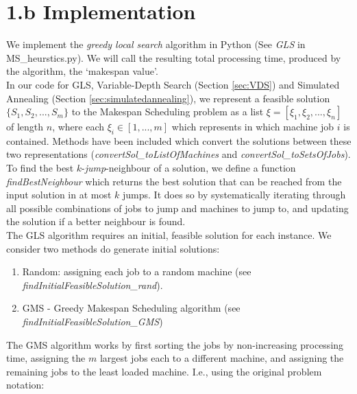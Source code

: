 \documentclass[12pt,a4paper,reqno]{article}
\begin{document}
\section*{1.b Implementation} \label{sec:implementation}
We implement the \textit{greedy local search} algorithm in Python (See \emph{GLS} in MS\_heurstics.py). We will call the resulting total processing time, produced by the algorithm, the `makespan value'. \\

In our code for GLS, Variable-Depth Search (Section \ref{sec:VDS}) and Simulated Annealing (Section \ref{sec:simulatedannealing}), we represent a feasible solution $\{S_1,S_2,...,S_m\}$ to the Makespan Scheduling problem as a list $\xi = [\xi_1,\xi_2,...,\xi_n]$ of length $n$, where each $\xi_i \in [1,...,m]$ which represents in which machine job $i$ is contained. Methods have been included which convert the solutions between these two representations (\textit{convertSol\_toListOfMachines} and \textit{convertSol\_toSetsOfJobs}). \\

To find the best $k$-\emph{jump}-neighbour of a solution, we define a function \emph{findBestNeighbour} which returns the best solution that can be reached from the input solution in at most $k$ jumps. It does so by systematically iterating through all possible combinations of jobs to jump and machines to jump to, and updating the solution if a better neighbour is found.\\

The GLS algorithm requires an initial, feasible solution for each instance. We consider two methods do generate initial solutions:
\begin{enumerate}
\item Random: assigning each job to a random machine (see \emph{findInitialFeasibleSolution\_rand}).
\item GMS - Greedy Makespan Scheduling algorithm (see \emph{findInitialFeasibleSolution\_GMS})
\end{enumerate}

The GMS algorithm works by first sorting the jobs by non-increasing processing time, assigning the $m$ largest jobs each to a different machine, and assigning the remaining jobs to the least loaded machine. I.e., using the original problem notation:
\end{document}
